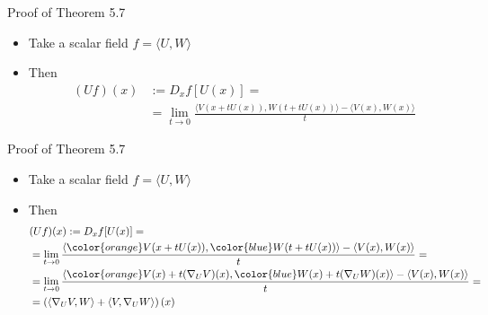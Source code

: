 \documentclass{beamer}
\begin{document}
\begin{frame}{Proof of Theorem 5.7}
    \begin{itemize}[<+->]
        \item Take a scalar field $f = \langle U, W\rangle$ 
        \item Then 
        \begin{align*}
            (Uf)(x) &:= D_xf[U(x)] = \\
            &= \lim_{t\to 0}{\frac{\langle V(x+tU(x)), W(t+tU(x)) \rangle - \langle  V(x), W(x)\rangle }{t}} 
        \end{align*}
    \end{itemize}
\end{frame}

\begin{frame}{Proof of Theorem 5.7}
    \begin{itemize}
        \item Take a scalar field $f = \langle U, W\rangle$ 
        \item Then 
        \begin{align*}
            &(Uf)(x) := D_xf[U(x)] = \\
            &= \lim_{t\to 0}{\frac{\langle {\color{orange}V(x+tU(x))}, {\color{blue}W(t+tU(x))} \rangle - \langle  V(x), W(x)\rangle }{t}} = \\
            &= \lim_{t\to 0}{\frac{\langle {\color{orange}V(x) + t(\nabla_U V)(x)}, {\color{blue}W(x) + t(\nabla_U W)(x) }\rangle - \langle V(x), W(x)\rangle }{t}} = \\
            &= \left(\langle \nabla_U V, W\rangle +\langle  V, \nabla_U W\rangle\right)(x)
        \end{align*}
    \end{itemize}
\end{frame}
\end{document}
